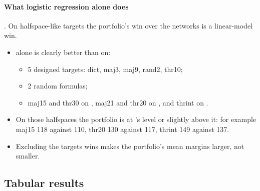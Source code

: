 \paragraph{What logistic regression alone does}\label{sec:lin} . On halfspace-like targets the portfolio's win over the networks is a linear-model win.
\begin{itemize}
\item {} alone is clearly better than  on:
  \begin{itemize}
  \item 5 designed targets: dict, maj3, maj9, rand2, thr10;
  \item 2 random formulas;
  \item maj15 and thr30 on , maj21 and thr20 on , and thrint on .
  \end{itemize}
\item On those halfspaces the portfolio is at 's level or slightly above it: for example maj15 118 against 110, thr20 130 against 117, thrint 149 against 137.
\item Excluding the targets  wins makes the portfolio's mean margins larger, not smaller.
\end{itemize}

\subsection{Tabular results}\label{sec:tabular}

